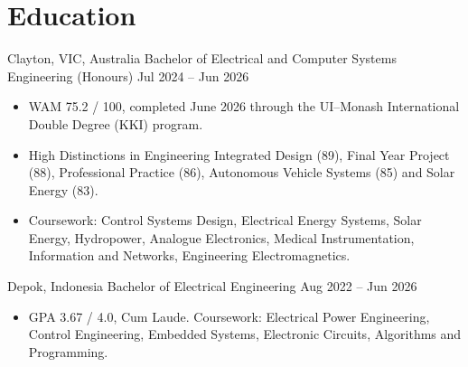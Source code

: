 \section*{Education}

{Clayton, VIC, Australia}
{Bachelor of Electrical and Computer Systems Engineering (Honours)}
{Jul 2024 -- Jun 2026}
{
\begin{itemize}
    \item WAM 75.2 / 100, completed June 2026 through the UI--Monash International Double Degree (KKI) program.
    \item High Distinctions in Engineering Integrated Design (89), Final Year Project (88), Professional Practice (86), Autonomous Vehicle Systems (85) and Solar Energy (83).
    \item Coursework: Control Systems Design, Electrical Energy Systems, Solar Energy, Hydropower, Analogue Electronics, Medical Instrumentation, Information and Networks, Engineering Electromagnetics.
\end{itemize}
}

{Depok, Indonesia}
{Bachelor of Electrical Engineering}
{Aug 2022 -- Jun 2026}
{
\begin{itemize}
    \item GPA 3.67 / 4.0, Cum Laude. Coursework: Electrical Power Engineering, Control Engineering, Embedded Systems, Electronic Circuits, Algorithms and Programming.
\end{itemize}
}
